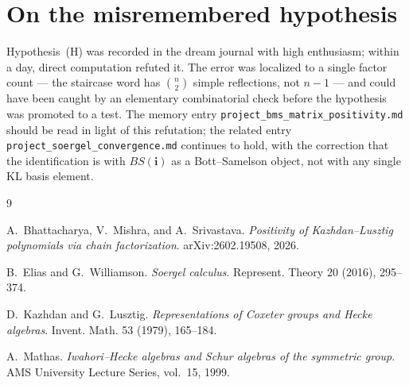 \documentclass[11pt]{article}
\theoremstyle{definition}
\begin{document}
\section{On the misremembered hypothesis}\label{sec:honesty}

Hypothesis~(H) was recorded in the dream journal with high enthusiasm;
within a day, direct computation refuted it. The error was localized to a
single factor count --- the staircase word has $\binom{n}{2}$ simple
reflections, not $n-1$ --- and could have been caught by an elementary
combinatorial check before the hypothesis was promoted to a test. The memory
entry \texttt{project\_bms\_matrix\_positivity.md} should be read in light
of this refutation; the related entry \texttt{project\_soergel\_convergence.md}
continues to hold, with the correction that the identification is with
$BS(\mathbf{i})$ as a Bott--Samelson object, not with any single KL basis
element.

\begin{thebibliography}{9}

 A.~Bhattacharya, V.~Mishra, and A.~Srivastava.
\emph{Positivity of Kazhdan--Lusztig polynomials via chain factorization}.
arXiv:2602.19508, 2026.

 B.~Elias and G.~Williamson.
\emph{Soergel calculus}. Represent. Theory 20 (2016), 295--374.

 D.~Kazhdan and G.~Lusztig.
\emph{Representations of Coxeter groups and Hecke algebras}. Invent. Math.
53 (1979), 165--184.

 A.~Mathas.
\emph{Iwahori--Hecke algebras and Schur algebras of the symmetric group}.
AMS University Lecture Series, vol.~15, 1999.

\end{thebibliography}
\end{document}
